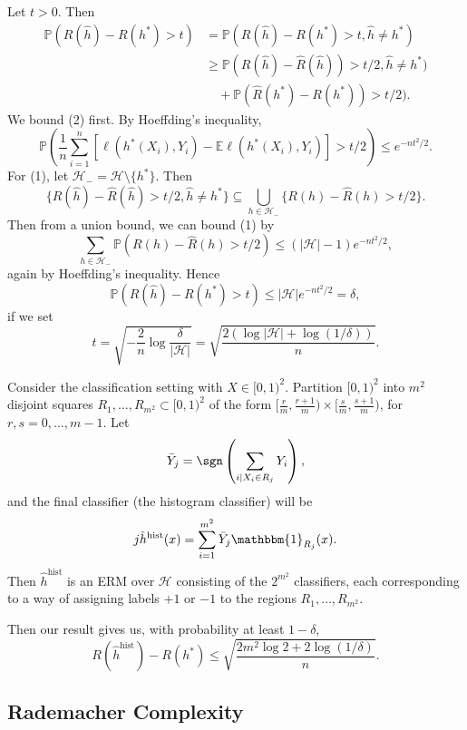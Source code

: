 \documentclass[12pt]{article}
\begin{document}
\begin{proofbox}
	Let $t > 0$. Then
	\begin{align*}
		\mathbb{P}(R(\hat h) - R(h^\ast) > t) &= \mathbb{P}(R(\hat h) - R(h^\ast) > t, \hat h \neq h^\ast) \\
						      &\geq \mathbb{P}(R(\hat h) - \hat R(\hat h)) > t/2, \hat h \neq h^\ast) \tag{1}\\
						      &\quad + \mathbb{P}(\hat R(h^\ast) - R(h^\ast)) > t/2). \tag{2}
	\end{align*}
	We bound (2) first. By Hoeffding's inequality,
	\[
		\mathbb{P}\left( \frac{1}{n} \sum_{i = 1}^n [\ell(h^\ast(X_i), Y_i) - \mathbb{E} \ell(h^\ast(X_i), Y_i)] > t/2 \right) \leq e^{-nt^2/2}.
	\]
	For (1), let $\mathcal{H}_- = \mathcal{H} \setminus \{h^\ast\}$. Then
	\[
		\{R(\hat h) - \hat R(\hat h) > t/2, \hat h \neq h^\ast\} \subseteq \bigcup_{h \in \mathcal{H}_-} \{R(h) - \hat R(h) > t/2\}.
	\]
	Then from a union bound, we can bound (1) by
	\[
	\sum_{h \in \mathcal{H}_-} \mathbb{P}(R(h) - \hat R(h) > t/2) \leq (|\mathcal{H}| - 1) e^{-nt^2/2},
	\]
	again by Hoeffding's inequality. Hence
	\[
	\mathbb{P}(R(\hat h) - R(h^\ast) > t) \leq |\mathcal{H}| e^{-nt^2/2} = \delta,
	\]
	if we set
	\[
		t = \sqrt{- \frac{2}{n} \log \frac{\delta}{|\mathcal{H}|}} = \sqrt{\frac{2 (\log |\mathcal{H}| + \log(1/\delta))}{n}}.
	\]
\end{proofbox}

\begin{exbox}
	Consider the classification setting with $X \in [0,1)^2$. Partition $[0, 1)^2$ into $m^2$ disjoint squares $R_1, \ldots, R_{m^2} \subset [0, 1)^2$ of the form $[\frac{r}{m}, \frac{r+1}{m}) \times [\frac{s}{m}, \frac{s+1}{m})$, for $r, s = 0, \ldots, m-1$. Let
	\[
	\bar Y_j = \sgn \left( \sum_{i \mid X_i \in R_j} Y_i \right),
	\]
	and the final classifier (the histogram classifier) will be
	\[
j	\hat h^{\mathrm{hist}}(x) = \sum_{i = 1}^{m^2} \bar Y_j \mathbbm{1}_{R_j}(x).
	\]
	Then $\hat h^{\mathrm{hist}}$ is an ERM over $\mathcal{H}$ consisting of the $2^{m^2}$ classifiers, each corresponding to a way of assigning labels $+1$ or $-1$ to the regions $R_1, \ldots, R_{m^2}$.

	Then our result gives us, with probability at least $1 - \delta$,
	\[
		R(\hat h^{\mathrm{hist}}) - R(h^\ast) \leq \sqrt{\frac{2m^2 \log 2 + 2 \log (1/\delta)}{n}}.
	\]

\end{exbox}

\subsection{Rademacher Complexity}
\label{sub:r_comp}
\end{document}
